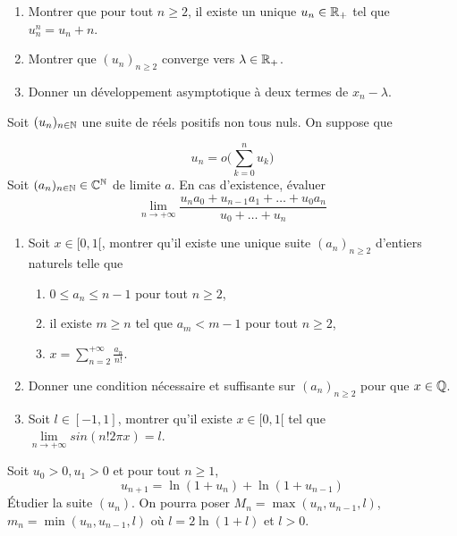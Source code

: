 \documentclass[12pt]{article}
\begin{document}
\begin{exercise}
	\phantom{}
	\begin{enumerate}
		\item
		Montrer que pour tout $n\geqslant 2$, il existe un unique $u_{n}\in\mathbb{R}_{+}$
		tel que $u_{n}^{n}=u_{n}+n$.
		\item
		Montrer que $(u_{n})_{n\geqslant 2}$ converge vers $\lambda\in\mathbb{R}_{+}$.
		\item
		Donner un développement asymptotique à deux termes de $x_{n}-\lambda$.
	\end{enumerate}
\end{exercise}

\begin{exercise}
	Soit $(u_{n})_{n\in\mathbb{N}}$ une suite de réels positifs non tous nuls. On suppose
	que
	
	$$u_n=o\Biggl(\sum_{k=0}^{n}u_{k}\Biggr)$$ Soit $(a_{n})_{n\in\mathbb{N}}\in\mathbb{C}^{\mathbb{N}}$
	de limite $a$. En cas d'existence, évaluer
	$$\lim\limits_{n\to+\infty}\frac{u_{n}a_{0}+u_{n-1}a_{1}+\dots+u_{0}a_{n}}{u_{0}+\dots+u_{n}}$$
\end{exercise}

\begin{exercise}
	\phantom{}
	\begin{enumerate}
		\item
		Soit $x\in[0,1[$, montrer qu'il existe une unique suite
		$(a_{n})_{n\geqslant 2}$ d'entiers naturels telle que 
		\begin{enumerate}
			\item
			[(i)] $0\leqslant a_{n}\leqslant n-1$ pour tout $n\geqslant2$,
			\item
			[(ii)] il existe $m\geqslant n$ tel que $a_{m}<m-1$ pour tout
			$n\geqslant2$,
			\item
			[(iii)] $x=\sum_{n=2}^{+\infty}\frac{a_{n}}{n!}$.
		\end{enumerate}
		\item
		Donner une condition nécessaire et suffisante sur $(a_{n})_{n\geqslant2}$
		pour que $x\in\mathbb{Q}$.
		\item
		Soit $l\in[-1,1]$, montrer qu'il existe $x\in[0,1[$ tel que
		$\lim\limits_{n\to+\infty}sin(n!2\pi x)=l$.
	\end{enumerate}
\end{exercise}

\begin{exercise}
	Soit $u_0>0,u_1>0$ et pour tout $n\geqslant 1$,
	$$u_{n+1}=\ln(1+u_{n})+\ln(1+u_{n-1})$$ Étudier la suite $(u_{n})$. On pourra
	poser $M_{n}=\max(u_{n},u_{n-1},l)$, $m_{n}=\min(u_{n},u_{n-1},l)$ où
	$l=2\ln(1+l)$ et $l>0$.
\end{exercise}
\end{document}
